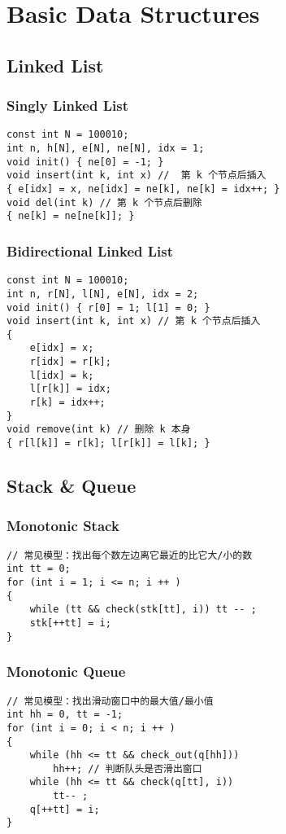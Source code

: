 \chapter{Basic Data Structures}\label{chap:BasicDaraStructures}
\section{Linked List}
\subsection{Singly Linked List}
\begin{lstlisting}
const int N = 100010;
int n, h[N], e[N], ne[N], idx = 1;
void init() { ne[0] = -1; }
void insert(int k, int x) //  第 k 个节点后插入
{ e[idx] = x, ne[idx] = ne[k], ne[k] = idx++; }
void del(int k) // 第 k 个节点后删除
{ ne[k] = ne[ne[k]]; }
\end{lstlisting}
\subsection{Bidirectional Linked List}
\begin{lstlisting}
const int N = 100010;
int n, r[N], l[N], e[N], idx = 2;
void init() { r[0] = 1; l[1] = 0; }
void insert(int k, int x) // 第 k 个节点后插入
{
    e[idx] = x;
    r[idx] = r[k];
    l[idx] = k;
    l[r[k]] = idx;
    r[k] = idx++;
}
void remove(int k) // 删除 k 本身
{ r[l[k]] = r[k]; l[r[k]] = l[k]; }
\end{lstlisting}
\section{Stack \& Queue}
\subsection{Monotonic Stack}
\begin{lstlisting}
// 常见模型：找出每个数左边离它最近的比它大/小的数
int tt = 0;
for (int i = 1; i <= n; i ++ )
{
    while (tt && check(stk[tt], i)) tt -- ;
    stk[++tt] = i;
}
\end{lstlisting}
\subsection{Monotonic Queue}
\begin{lstlisting}
// 常见模型：找出滑动窗口中的最大值/最小值
int hh = 0, tt = -1;
for (int i = 0; i < n; i ++ )
{
    while (hh <= tt && check_out(q[hh]))
        hh++; // 判断队头是否滑出窗口
    while (hh <= tt && check(q[tt], i))
        tt-- ;
    q[++tt] = i;
}
\end{lstlisting}
